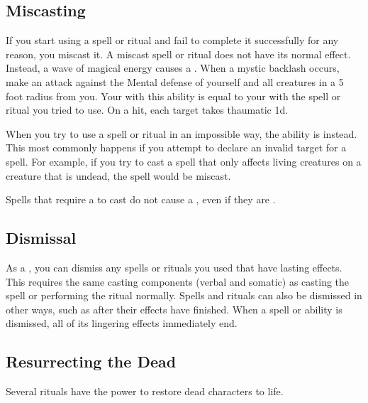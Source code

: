     \subsection{Miscasting}\label{Miscasting}

        If you start using a spell or ritual and fail to complete it successfully for any reason, you miscast it.
        A miscast spell or ritual does not have its normal effect.
        Instead, a wave of magical energy causes a .
        When a mystic backlash occurs, make an attack against the Mental defense of yourself and all creatures in a 5 foot radius from you.
        Your  with this ability is equal to your  with the spell or ritual you tried to use.
        On a hit, each target takes thaumatic  \minus1d.

         When you try to use a spell or ritual in an impossible way, the ability is  instead.
        This most commonly happens if you attempt to declare an invalid target for a spell.
        For example, if you try to cast a spell that only affects living creatures on a creature that is undead, the spell would be miscast.

         Spells that require a  to cast do not cause a , even if they are .

    \subsection{Dismissal}
        As a , you can dismiss any spells or rituals you used that have lasting effects.
        This requires the same casting components (verbal and somatic) as casting the spell or performing the ritual normally.
        Spells and rituals can also be dismissed in other ways, such as after their effects have finished.
        When a spell or ability is dismissed, all of its lingering effects immediately end.

    \subsection{Resurrecting the Dead}\label{Resurrecting the Dead}
        Several rituals have the power to restore dead characters to life.

